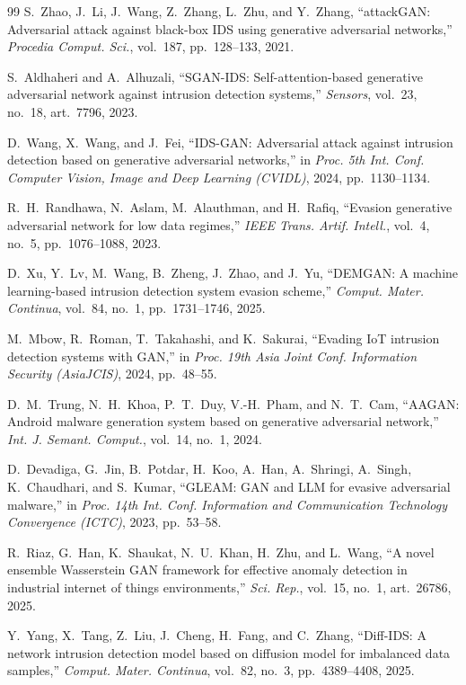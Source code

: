 \documentclass[11pt,a4paper]{article}
\begin{document}
\begin{thebibliography}{99}
 S.~Zhao, J.~Li, J.~Wang, Z.~Zhang, L.~Zhu, and Y.~Zhang,
``attackGAN: Adversarial attack against black-box IDS using generative
adversarial networks,'' \emph{Procedia Comput. Sci.}, vol.~187, pp.~128--133,
2021.

 S.~Aldhaheri and A.~Alhuzali, ``SGAN-IDS: Self-attention-based
generative adversarial network against intrusion detection systems,''
\emph{Sensors}, vol.~23, no.~18, art.~7796, 2023.

 D.~Wang, X.~Wang, and J.~Fei, ``IDS-GAN: Adversarial attack
against intrusion detection based on generative adversarial networks,'' in
\emph{Proc. 5th Int. Conf. Computer Vision, Image and Deep Learning (CVIDL)},
2024, pp.~1130--1134.

 R.~H.~Randhawa, N.~Aslam, M.~Alauthman, and H.~Rafiq,
``Evasion generative adversarial network for low data regimes,'' \emph{IEEE
Trans. Artif. Intell.}, vol.~4, no.~5, pp.~1076--1088, 2023.

 D.~Xu, Y.~Lv, M.~Wang, B.~Zheng, J.~Zhao, and J.~Yu, ``DEMGAN:
A machine learning-based intrusion detection system evasion scheme,''
\emph{Comput. Mater. Continua}, vol.~84, no.~1, pp.~1731--1746, 2025.

 M.~Mbow, R.~Roman, T.~Takahashi, and K.~Sakurai, ``Evading IoT
intrusion detection systems with GAN,'' in \emph{Proc. 19th Asia Joint Conf.
Information Security (AsiaJCIS)}, 2024, pp.~48--55.

 D.~M.~Trung, N.~H.~Khoa, P.~T.~Duy, V.-H.~Pham, and N.~T.~Cam,
``AAGAN: Android malware generation system based on generative adversarial
network,'' \emph{Int. J. Semant. Comput.}, vol.~14, no.~1, 2024.

 D.~Devadiga, G.~Jin, B.~Potdar, H.~Koo, A.~Han, A.~Shringi,
A.~Singh, K.~Chaudhari, and S.~Kumar, ``GLEAM: GAN and LLM for evasive
adversarial malware,'' in \emph{Proc. 14th Int. Conf. Information and
Communication Technology Convergence (ICTC)}, 2023, pp.~53--58.

 R.~Riaz, G.~Han, K.~Shaukat, N.~U.~Khan, H.~Zhu, and L.~Wang,
``A novel ensemble Wasserstein GAN framework for effective anomaly detection in
industrial internet of things environments,'' \emph{Sci. Rep.}, vol.~15, no.~1,
art.~26786, 2025.

 Y.~Yang, X.~Tang, Z.~Liu, J.~Cheng, H.~Fang, and C.~Zhang,
``Diff-IDS: A network intrusion detection model based on diffusion model for
imbalanced data samples,'' \emph{Comput. Mater. Continua}, vol.~82, no.~3,
pp.~4389--4408, 2025.


\end{thebibliography}
\end{document}
